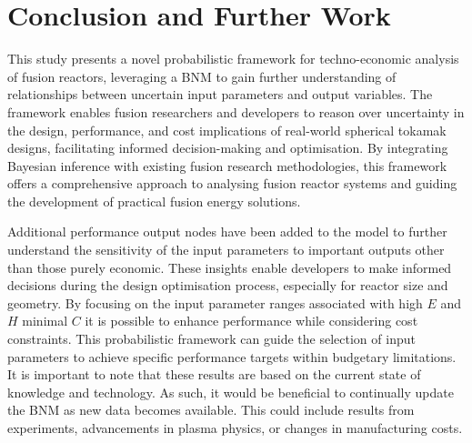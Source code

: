 \documentclass[journal]{IEEEtran}
\begin{document}


\section{Conclusion and Further Work}\label{sec:conc}

This study presents a novel probabilistic framework for techno-economic analysis of fusion reactors, leveraging a BNM to gain further understanding of relationships between uncertain input parameters and output variables. The framework enables fusion researchers and developers to reason over uncertainty in the design, performance, and cost implications of real-world spherical tokamak designs, facilitating informed decision-making and optimisation. By integrating Bayesian inference with existing fusion research methodologies, this framework offers a comprehensive approach to analysing fusion reactor systems and guiding the development of practical fusion energy solutions. 

Additional performance output nodes have been added to the model to further understand the sensitivity of the input parameters to important outputs other than those purely economic. These insights enable developers to make informed decisions during the design optimisation process, especially for reactor size and geometry. By focusing on the input parameter ranges associated with high $E$ and $H$ minimal $C$ it is possible to enhance performance while considering cost constraints. This probabilistic framework can guide the selection of input parameters to achieve specific performance targets within budgetary limitations. It is important to note that these results are based on the current state of knowledge and technology. As such, it would be beneficial to continually update the BNM as new data becomes available. This could include results from experiments, advancements in plasma physics, or changes in manufacturing costs.
\end{document}
